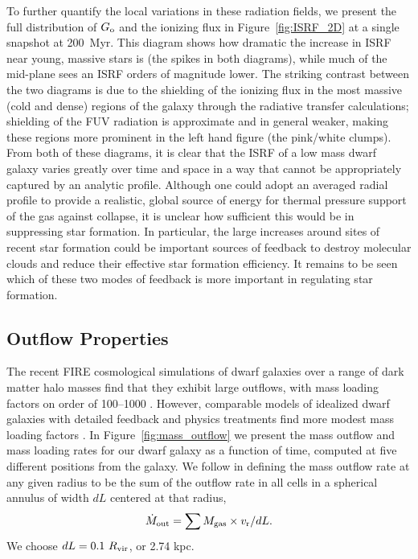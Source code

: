 \documentclass[twocolumn]{aastex61}
\begin{document}
To further quantify the local variations in these radiation fields, we present the full distribution of $G_{\rm o}$ and the  ionizing flux in Figure~\ref{fig:ISRF_2D} at a single snapshot at 200~Myr. This diagram shows how dramatic the increase in ISRF near young, massive stars is (the spikes in both diagrams), while much of the mid-plane sees an ISRF orders of magnitude lower. The striking contrast between the two diagrams is due to the shielding of the  ionizing flux in the most massive (cold and dense) regions of the galaxy through the radiative transfer calculations; shielding of the FUV radiation is approximate and in general weaker, making these regions more prominent in the left hand figure (the pink/white clumps). From both of these diagrams, it is clear that the ISRF of a low mass dwarf galaxy varies greatly over time and space in a way that cannot be appropriately captured by an analytic profile. Although one could adopt an averaged radial profile to provide a realistic, global source of energy for thermal pressure support of the gas against collapse, it is unclear how sufficient this would be in suppressing star formation. In particular, the large increases around sites of recent star formation could be important sources of feedback to destroy molecular clouds and reduce their effective star formation efficiency. It remains to be seen which of these two modes of feedback is more important in regulating star formation.

\subsection{Outflow Properties}
\label{sec:outflows}

The recent FIRE cosmological simulations of dwarf galaxies over a range of dark matter halo masses find that they exhibit large outflows, with mass loading factors on order of 100--1000 \citep{Muratov2015}. However, comparable models of idealized dwarf galaxies with detailed feedback and physics treatments find more modest mass loading factors \citep{Hu2016,Hu2017}. In Figure~\ref{fig:mass_outflow} we present the mass outflow and mass loading rates for our dwarf galaxy as a function of time, computed at five different positions from the galaxy. We follow \citet{Muratov2015} in defining the mass outflow rate at any given radius to be the sum of the outflow rate in all cells in a spherical annulus of width $dL$ centered at that radius,
\begin{equation} \label{eq:dotM}
\dot{M}_{\rm out} = \sum M_{\rm gas} \times v_{\rm r} / dL.
\end{equation} 
We choose $dL = 0.1~R_{\rm vir}$, or 2.74 kpc. 
\end{document}
